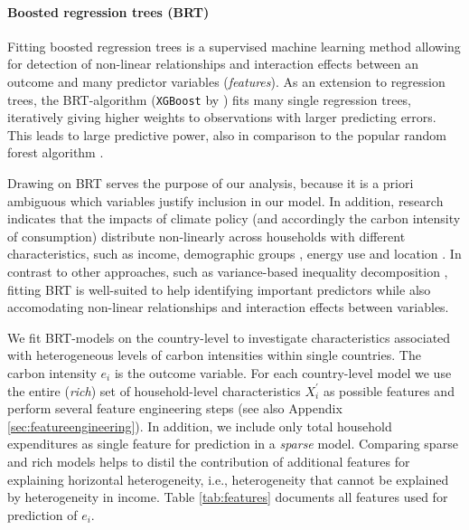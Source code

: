 \documentclass[12pt, a4paper]{article}
\begin{document}
\paragraph{Boosted regression trees (BRT)} Fitting boosted regression trees \autocite{Friedman.2003, Elith.2008} is a supervised machine learning method allowing for detection of non-linear relationships and interaction effects between an outcome and many predictor variables (\textit{features}). As an extension to regression trees, the BRT-algorithm (\texttt{XGBoost} by \textcite{Chen.2016}) fits many single regression trees, iteratively giving higher weights to observations with larger predicting errors. This leads to large predictive power, also in comparison to the popular random forest algorithm \autocite[e.g.,][]{Bentejac.2021}.

Drawing on BRT serves the purpose of our analysis, because it is a priori ambiguous which variables justify inclusion in our model. In addition, research indicates that the impacts of climate policy (and accordingly the carbon intensity of consumption) distribute non-linearly across households with different characteristics, such as income, demographic groups \autocite{Missbach.2023}, energy use \autocite{Farrell.2017} and location \autocite{Chan.2023}. In contrast to other approaches, such as variance-based inequality decomposition \autocite{Farrell.2017,Sager.2019,Missbach.2024}, fitting BRT is well-suited to help identifying important predictors while also accomodating non-linear relationships and interaction effects between variables.

We fit BRT-models on the country-level to investigate characteristics associated with heterogeneous levels of carbon intensities within single countries. The carbon intensity $e_{i}$ is the outcome variable. For each country-level model we use the entire (\textit{rich}) set of household-level characteristics $X_{i}^{'}$ as possible features and perform several feature engineering steps (see also Appendix \ref{sec:featureengineering}). In addition, we include only total household expenditures as single feature for prediction in a \textit{sparse} model. Comparing sparse and rich models helps to distil the contribution of additional features for explaining horizontal heterogeneity, i.e., heterogeneity that cannot be explained by heterogeneity in income. Table \ref{tab:features} documents all features used for prediction of $e_{i}$.


\end{document}
